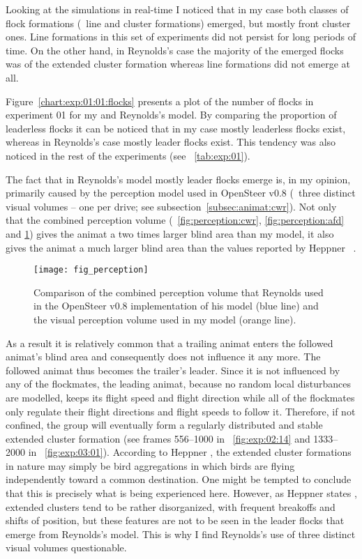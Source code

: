Looking at the simulations in real-time I noticed that in my case both classes of flock formations (\ie\ line and cluster formations) emerged, but mostly front cluster ones. Line formations in this set of experiments did not persist for long periods of time. On the other hand, in Reynolds's case the majority of the emerged flocks was of the extended cluster formation whereas line formations did not emerge at all.

Figure~\ref{chart:exp:01:01:flocks} presents a plot of the number of flocks in experiment 01 for my and Reynolds's model. By comparing the proportion of leaderless flocks it can be noticed that in my case mostly leaderless flocks exist, whereas in Reynolds's case mostly leader flocks exist. This tendency was also noticed in the rest of the experiments (see \tab~\ref{tab:exp:01}).

The fact that in Reynolds's model mostly leader flocks emerge is, in my opinion, primarily caused by the perception model used in OpenSteer v0.8 (\ie\ three distinct visual volumes -- one per drive; see subsection~\ref{subsec:animat:cwr}). Not only that the combined perception volume (\figs~\ref{fig:perception:cwr}, \ref{fig:perception:afd} and \ref{fig:perception}) gives the animat a two times larger blind area than my model, it also gives the animat a much larger blind area than the values reported by Heppner \etal\ \cite{heppner:1985}.
%
\begin{figure}
  \texttt{[image: fig\_perception]}
  \caption{Comparison of the combined perception volume that Reynolds used in the OpenSteer v0.8 implementation of his model \cite{reynolds:1999} (blue line) and the visual perception volume used in my model (orange line).}
  \label{fig:perception}
\end{figure}
%
As a result it is relatively common that a trailing animat enters the followed animat's blind area and consequently does not influence it any more. The followed animat thus becomes the trailer's leader. Since it is not influenced by any of the flockmates, the leading animat, because no random local disturbances are modelled, keeps its flight speed and flight direction while all of the flockmates only regulate their flight directions and flight speeds to follow it. Therefore, if not confined, the group will eventually form a regularly distributed and stable extended cluster formation (see frames 556--1000 in \fig~\ref{fig:exp:02:14} and 1333--2000 in \fig~\ref{fig:exp:03:01}). According to Heppner \cite{heppner:1974a}, the extended cluster formations in nature may simply be bird aggregations in which birds are flying independently toward a common destination. One might be tempted to conclude that this is precisely what is being experienced here. However, as Heppner states \cite{heppner:1974a}, extended clusters tend to be rather disorganized, with frequent breakoffs and shifts of position, but these features are not to be seen in the leader flocks that emerge from Reynolds's model. This is why I find Reynolds's use of three distinct visual volumes questionable.

